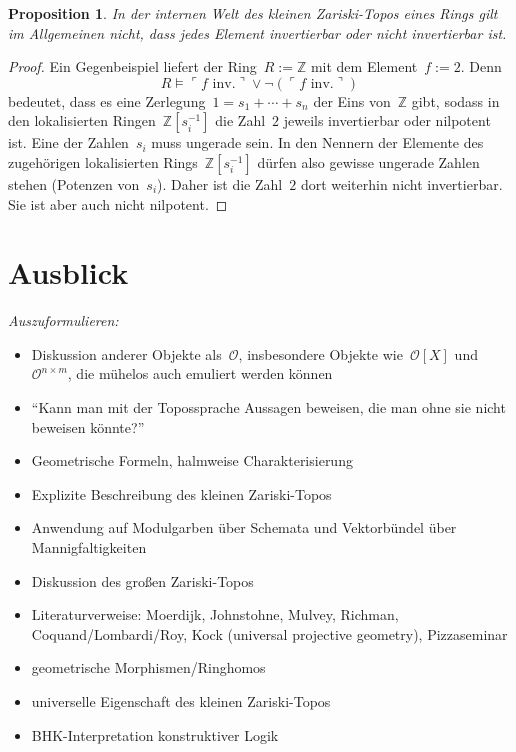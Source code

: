 \documentclass[a4paper,ngerman,12pt]{scrartcl}
\theoremstyle{definition}
\theoremstyle{plain}
\newtheorem{prop}[defn]{Proposition}
\theoremstyle{remark}
\newcommand{\ZZ}{\mathbb{Z}}
\renewcommand{\O}{\mathcal{O}}
\renewcommand{\_}{\mathpunct{.}\,}
\newcommand{\?}{\,{:}\,}
\newcommand{\speak}[1]{\ulcorner\text{#1}\urcorner}
\begin{document}
\begin{prop}In der internen Welt des kleinen Zariski-Topos eines Rings gilt im
Allgemeinen \emph{nicht}, dass jedes Element invertierbar oder nicht
invertierbar ist.\end{prop}
\begin{proof}Ein Gegenbeispiel liefert der Ring~$R := \ZZ$ mit dem Element~$f
:= 2$. Denn
\[ R \models \speak{$f$ inv.} \vee \neg(\speak{$f$ inv.}) \]
bedeutet, dass es eine Zerlegung~$1 = s_1 + \cdots + s_n$ der Eins
von~$\ZZ$ gibt, sodass in den lokalisierten Ringen~$\ZZ[s_i^{-1}]$ die Zahl~$2$
jeweils invertierbar oder nilpotent ist. Eine der Zahlen~$s_i$ muss ungerade
sein. In den Nennern der Elemente des zugehörigen lokalisierten
Rings~$\ZZ[s_i^{-1}]$ dürfen also gewisse ungerade Zahlen stehen (Potenzen
von~$s_i$). Daher ist die Zahl~$2$ dort weiterhin nicht invertierbar. Sie ist
aber auch nicht nilpotent.
\end{proof}


\section{Ausblick}

\emph{Auszuformulieren:}

\begin{itemize}
\item Diskussion anderer Objekte als~$\O$, insbesondere Objekte wie~$\O[X]$
und~$\O^{n \times m}$, die mühelos auch emuliert werden können
\item "`Kann man mit der Topossprache Aussagen
beweisen, die man ohne sie nicht beweisen könnte?"'
\item Geometrische Formeln, halmweise Charakterisierung
\item Explizite Beschreibung des kleinen Zariski-Topos
\item Anwendung auf Modulgarben über Schemata und Vektorbündel über Mannigfaltigkeiten
\item Diskussion des großen Zariski-Topos
\item Literaturverweise: Moerdijk, Johnstohne, Mulvey, Richman,
Coquand/Lombardi/Roy, Kock (universal projective geometry), Pizzaseminar
\item geometrische Morphismen/Ringhomos
\item universelle Eigenschaft des kleinen Zariski-Topos
\item BHK-Interpretation konstruktiver Logik
\end{itemize}
\end{document}
